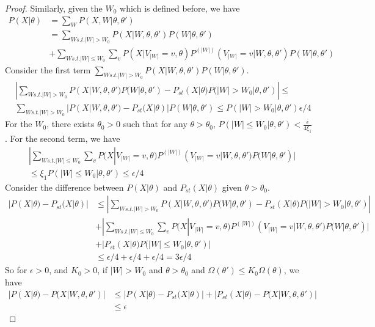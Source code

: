 \begin{proof}
Similarly, given the $W_0$ which is defined before, we have
\begin{align*}
P(X | \theta) &= \sum_W P(X , W | \theta, \theta')\\
&= \sum_{W s.t. |W| > W_0} P(X | W, \theta, \theta') P(W | \theta, \theta') \\
&+ \sum_{W s.t. |W| \leq W_0} \sum_{v} P(X | V_{|W|} = v, \theta) P^{(|W|)}(V_{|W|} = v | W, \theta, \theta') P(W|\theta, \theta')
\end{align*}
Consider the first term $\sum_{W s.t. |W| > W_0} P(X | W, \theta, \theta') P(W | \theta, \theta')$.\\
\begin{align*}
&|\sum_{W s.t. |W| > W_0} P(X | W, \theta, \theta') P(W | \theta, \theta')  - P_{st}(X | \theta)P(|W| > W_0 | \theta, \theta')|  \leq  \\
&\sum_{W s.t. |W| > W_0} |P(X | W, \theta, \theta') - P_{st}(X | \theta)|  P(W | \theta, \theta') \leq P(|W| > W_0 | \theta, \theta') \epsilon / 4 
\end{align*}
For the $W_0$, there exists $\theta_0 > 0$ such that for any $\theta > \theta_0$, $P(|W| \leq W_0 | \theta, \theta') < \frac{\epsilon}{4\xi_1} $.
For the second term, we have 
\begin{align*}
&|\sum_{W s.t. |W| \leq W_0} \sum_{v} P(X | V_{|W|} = v, \theta) P^{(|W|)}(V_{|W|} = v | W, \theta, \theta') P(W|\theta, \theta')|  \\
&\leq \xi_1 P(|W| \leq W_0 | \theta, \theta') \leq \epsilon / 4
\end{align*}
Consider the difference between $P(X|\theta)$ and $P_{st}(X|\theta)$ given $\theta > \theta_0$.
\begin{align*}
|P(X|\theta) - P_{st}(X|\theta)| &\leq |\sum_{W s.t. |W| > W_0} P(X | W, \theta, \theta') P(W | \theta, \theta')  - P_{st}(X | \theta)P(|W| > W_0 |\theta, \theta')| \\
&+ |\sum_{W s.t. |W| \leq W_0} \sum_{v} P(X | V_{|W|} = v, \theta) P^{(|W|)}(V_{|W|} = v | W, \theta, \theta') P(W|\theta, \theta')|\\
&+ |P_{st}(X | \theta)P(|W| \leq W_0 | \theta, \theta')|\\
&\leq \epsilon / 4 + \epsilon / 4 + \epsilon / 4 = 3\epsilon/4
\end{align*}
So for $\epsilon > 0$, and $K_0 > 0$, if $|W| > W_0$ and $\theta > \theta_0$ and $\Omega(\theta') \leq K_0 \Omega(\theta)$, we have 
\begin{align*}
|P(X | \theta) - P(X | W, \theta, \theta')| &\leq |P(X | \theta) -P_{st}(X | \theta) | + | P_{st}(X | \theta) -  P(X | W, \theta, \theta')|\\
& \leq \epsilon
\end{align*}

\end{proof}

